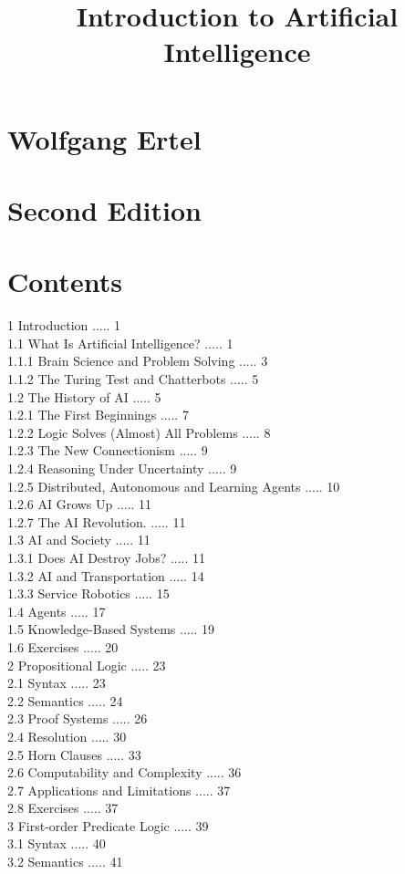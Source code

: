 \documentclass[10pt]{book}
\title{Introduction to Artificial Intelligence }
\author{}
\date{}
\begin{document}
\maketitle
\captionsetup{singlelinecheck=false}
\section*{Wolfgang Ertel}
\section*{Second Edition}
\section*{Contents}
1 Introduction ..... 1\\
1.1 What Is Artificial Intelligence? ..... 1\\
1.1.1 Brain Science and Problem Solving ..... 3\\
1.1.2 The Turing Test and Chatterbots ..... 5\\
1.2 The History of AI ..... 5\\
1.2.1 The First Beginnings ..... 7\\
1.2.2 Logic Solves (Almost) All Problems ..... 8\\
1.2.3 The New Connectionism ..... 9\\
1.2.4 Reasoning Under Uncertainty ..... 9\\
1.2.5 Distributed, Autonomous and Learning Agents ..... 10\\
1.2.6 AI Grows Up ..... 11\\
1.2.7 The AI Revolution. ..... 11\\
1.3 AI and Society ..... 11\\
1.3.1 Does AI Destroy Jobs? ..... 11\\
1.3.2 AI and Transportation ..... 14\\
1.3.3 Service Robotics ..... 15\\
1.4 Agents ..... 17\\
1.5 Knowledge-Based Systems ..... 19\\
1.6 Exercises ..... 20\\
2 Propositional Logic ..... 23\\
2.1 Syntax ..... 23\\
2.2 Semantics ..... 24\\
2.3 Proof Systems ..... 26\\
2.4 Resolution ..... 30\\
2.5 Horn Clauses ..... 33\\
2.6 Computability and Complexity ..... 36\\
2.7 Applications and Limitations ..... 37\\
2.8 Exercises ..... 37\\
3 First-order Predicate Logic ..... 39\\
3.1 Syntax ..... 40\\
3.2 Semantics ..... 41\\
\end{document}
